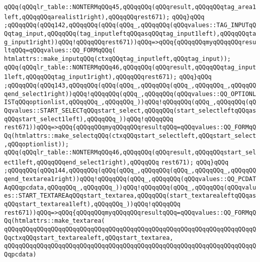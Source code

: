 \verb|qQQq(qQQqlr_table::NONTERMqQQq45,qQQqqQQq(qQQqresult,qQQqqQQqtag_area1left,qQQqqQQqarealist1right),qQQqqQQqrest671);|\newline
\verb|qQQq}qQQq|\newline
\verb|;qQQqqQQq(qQQq142,qQQqqQQq(qQQq(qQQq_,qQQqqQQq(qQQqvalues::TAG_INPUTqQQqtag_input,qQQqqQQq(tag_inputleftqQQqasqQQqtag_input1left),qQQqqQQqtag_input1right))qQQq!qQQqqQQqrest671))qQQq=>qQQq{qQQqqQQqmyqQQqqQQqresultqQQq=qQQqvalues::QQ_FORMqQQq(|\newline
\verb|htmlattrs::make_inputqQQq(ctxqQQqtag_inputleft,qQQqtag_input));|\newline
\verb|qQQq(qQQqlr_table::NONTERMqQQq46,qQQqqQQq(qQQqresult,qQQqqQQqtag_input1left,qQQqqQQqtag_input1right),qQQqqQQqrest671);|\newline
\verb|qQQq}qQQq|\newline
\verb|;qQQqqQQq(qQQq143,qQQqqQQq(qQQq(qQQq_,qQQqqQQq(qQQq_,qQQqqQQq_,qQQqqQQqend_select1right))qQQq!qQQqqQQq(qQQq_,qQQqqQQq(qQQqvalues::QQ_OPTIONLISTqQQqoptionlist,qQQqqQQq_,qQQqqQQq_))qQQq!qQQqqQQq(qQQq_,qQQqqQQq(qQQqvalues::START_SELECTqQQqstart_select,qQQqqQQq(start_selectleftqQQqasqQQqstart_select1left),qQQqqQQq_))qQQq!qQQqqQQq|\newline
\verb|rest671))qQQq=>qQQq{qQQqqQQqmyqQQqqQQqresultqQQq=qQQqvalues::QQ_FORMqQQq(htmlattrs::make_selectqQQq(ctxqQQqstart_selectleft,qQQqstart_select,qQQqoptionlist));|\newline
\verb|qQQq(qQQqlr_table::NONTERMqQQq46,qQQqqQQq(qQQqresult,qQQqqQQqstart_select1left,qQQqqQQqend_select1right),qQQqqQQq|\newline
\verb|rest671);|\newline
\verb|qQQq}qQQq|\newline
\verb|;qQQqqQQq(qQQq144,qQQqqQQq(qQQq(qQQq_,qQQqqQQq(qQQq_,qQQqqQQq_,qQQqqQQqend_textarea1right))qQQq!qQQqqQQq(qQQq_,qQQqqQQq(qQQqvalues::QQ_PCDATAqQQqpcdata,qQQqqQQq_,qQQqqQQq_))qQQq!qQQqqQQq(qQQq_,qQQqqQQq(qQQqvalues::START_TEXTAREAqQQqstart_textarea,qQQqqQQq(start_textarealeftqQQqasqQQqstart_textarea1left),qQQqqQQq_))qQQq!qQQqqQQq|\newline
\verb|rest671))qQQq=>qQQq{qQQqqQQqmyqQQqqQQqresultqQQq=qQQqvalues::QQ_FORMqQQq(htmlattrs::make_textarea(|\newline
\verb|qQQqqQQqqQQqqQQqqQQqqQQqqQQqqQQqqQQqqQQqqQQqqQQqqQQqqQQqqQQqqQQqqQQqqQQqctxqQQqstart_textarealeft,qQQqstart_textarea,|\newline
\verb|qQQqqQQqqQQqqQQqqQQqqQQqqQQqqQQqqQQqqQQqqQQqqQQqqQQqqQQqqQQqqQQqqQQqqQQqpcdata)|\newline
